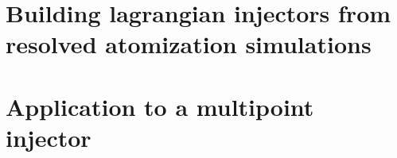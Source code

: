 \documentclass[twoside]{report}
\begin{document}
\part{Building lagrangian injectors from resolved atomization simulations}

\newpage 

\newpage

\newpage

\part{Application to a multipoint injector}
%

\newpage
%


%

\newpage

%



\fancyhead[LO]{}
\nocite{*}


\newpage

%
%
\end{document}
